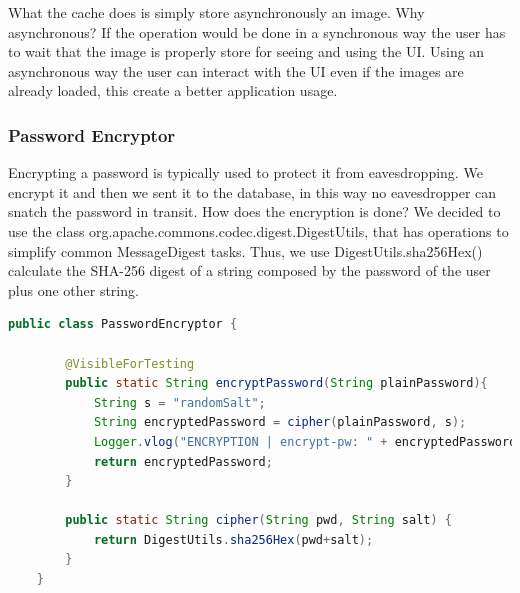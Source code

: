 What the cache does is simply store asynchronously an image. Why asynchronous? If the operation would be done in a synchronous way the user has to wait that the image is properly store for seeing and using the UI. Using an asynchronous way the user can interact with the UI even if the images are already loaded, this create a better application usage.
\subsubsection{Password Encryptor}
Encrypting a password is typically used to protect it from eavesdropping. We encrypt it and then we sent it to the database, in this way no eavesdropper can snatch the password in transit.
How does the encryption is done? We decided to use the class org.apache.commons.codec.digest.DigestUtils, that has operations to simplify common MessageDigest tasks. Thus, we use DigestUtils.sha256Hex() calculate the SHA-256 digest of a string composed by the password of the user plus one other string.

\begin{lstlisting}[language=Java]
	public class PasswordEncryptor {
		
		@VisibleForTesting
		public static String encryptPassword(String plainPassword){
			String s = "randomSalt";
			String encryptedPassword = cipher(plainPassword, s);
			Logger.vlog("ENCRYPTION | encrypt-pw: " + encryptedPassword);
			return encryptedPassword;
		}
		
		public static String cipher(String pwd, String salt) {
			return DigestUtils.sha256Hex(pwd+salt);
		}
	}
\end{lstlisting}
